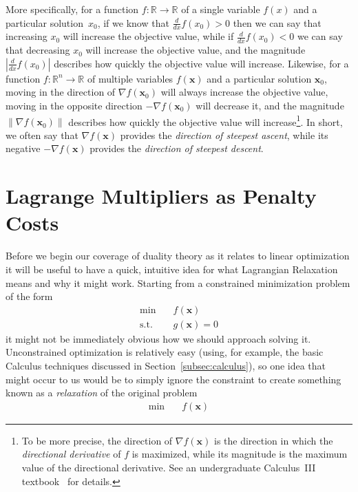 \documentclass[11pt]{article}
\theoremstyle{definition} %
\begin{document}
More specifically, for a function $f : \mathbb{R} \to \mathbb{R}$ of a single variable $f(x)$ and a particular solution~$x_0$, if we know that $\frac{d}{dx} f(x_0) > 0$ then we can say that increasing $x_0$ will increase the objective value, while if \mbox{$\frac{d}{dx} f(x_0) < 0$} we can say that decreasing $x_0$ will increase the objective value, and the magnitude $|\frac{d}{dx} f(x_0)|$ describes how quickly the objective value will increase. Likewise, for a function $f : \mathbb{R}^n \to \mathbb{R}$ of multiple variables $f(\mathbf{x})$ and a particular solution $\mathbf{x}_0$, moving in the direction of $\nabla f(\mathbf{x}_0)$ will always increase the objective value, moving in the opposite direction $-\nabla f(\mathbf{x}_0)$ will decrease it, and the magnitude $\|\nabla f(\mathbf{x}_0)\|$ describes how quickly the objective value will increase\footnote{To be more precise, the direction of $\nabla f(\mathbf{x})$ is the direction in which the \textit{directional derivative} of $f$ is maximized, while its magnitude is the maximum value of the directional derivative. See an undergraduate Calculus~III textbook~\mbox{\cite{stewart,openstax3}} for details.}. In short, we often say that $\nabla f(\mathbf{x})$ provides the \textit{direction of steepest ascent}, while its negative $-\nabla f(\mathbf{x})$ provides the \textit{direction of steepest descent}.

\newpage
\section{Lagrange Multipliers as Penalty Costs}
\label{app:penalty}

Before we begin our coverage of duality theory as it relates to linear optimization it will be useful to have a quick, intuitive idea for what Lagrangian Relaxation means and why it might work. Starting from a constrained minimization problem of the form
\begin{align}
	\label{eqn:relaxation1} \min \quad& f(\mathbf{x}) \\
	\label{eqn:relaxation2} \mathrm{s.t.} \quad& g(\mathbf{x}) = 0
\end{align}
it might not be immediately obvious how we should approach solving it. Unconstrained optimization is relatively easy (using, for example, the basic Calculus techniques discussed in Section~\ref{subsec:calculus}), so one idea that might occur to us would be to simply ignore the constraint to create something known as a \textit{relaxation} of the original problem
\begin{align*}
	\min \quad& f(\mathbf{x})
\end{align*}
\end{document}
